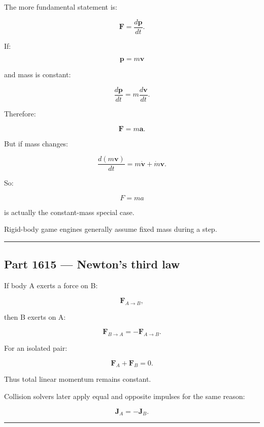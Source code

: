 \hypertarget{06-engine-ii-ch034-part-1614-newtons-second-law-in-momentum-form}{}

The more fundamental statement is:

\[
\boxed{
\mathbf{F}
=
\frac{d\mathbf{p}}{dt}.
}
\]

If:

\[
\mathbf{p}=m\mathbf{v}
\]

and mass is constant:

\[
\frac{d\mathbf{p}}{dt}
=
m\frac{d\mathbf{v}}{dt}.
\]

Therefore:

\[
\mathbf{F}
=
m\mathbf{a}.
\]

But if mass changes:

\[
\frac{d(m\mathbf{v})}{dt}
=
m\dot{\mathbf{v}}
+
\dot m\mathbf{v}.
\]

So:

\[
F=ma
\]

is actually the constant-mass special case.

Rigid-body game engines generally assume fixed mass during a step.

\begin{center}\rule{0.5\linewidth}{0.5pt}\end{center}

\subsection{Part 1615 --- Newton's third law}\label{06-engine-ii-ch034-part-1615-newtons-third-law}

\hypertarget{06-engine-ii-ch034-part-1615-newtons-third-law}{}

If body A exerts a force on B:

\[
\mathbf{F}_{A\rightarrow B},
\]

then B exerts on A:

\[
\boxed{
\mathbf{F}_{B\rightarrow A}
=
-\mathbf{F}_{A\rightarrow B}.
}
\]

For an isolated pair:

\[
\mathbf{F}_A+
\mathbf{F}_B=0.
\]

Thus total linear momentum remains constant.

Collision solvers later apply equal and opposite impulses for the same reason:

\[
\mathbf{J}_A=-\mathbf{J}_B.
\]

\begin{center}\rule{0.5\linewidth}{0.5pt}\end{center}

